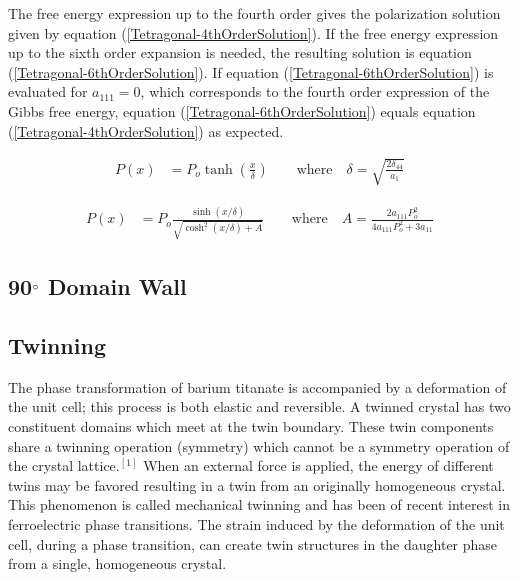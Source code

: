 \documentclass{article}
\begin{document}
The free energy expression up to the fourth order gives the polarization solution given by equation (\ref{Tetragonal-4thOrderSolution}).  If the free energy expression up to the sixth order expansion is needed, the resulting solution is equation (\ref{Tetragonal-6thOrderSolution}).  If equation (\ref{Tetragonal-6thOrderSolution}) is evaluated for $a_{111}= 0$, which corresponds to the fourth order expression of the Gibbs free energy, equation (\ref{Tetragonal-6thOrderSolution}) equals equation (\ref{Tetragonal-4thOrderSolution}) as expected.

\begin{align}
P(x) &= P_o \tanh{(\frac{x}{\delta})} \qquad \text{where} \quad \delta=\sqrt{\frac{2 \delta_{44}}{a_1}}
\label{Tetragonal-4thOrderSolution}
\end{align}

\begin{align}
P(x) &= P_o \frac{\sinh{(x/\delta)}}{\sqrt{\cosh^2{(x/\delta)} + A} } \qquad \text{where} \quad A=\frac{2 a_{111} P_o^2}{4 a_{111} P_o^2 + 3 a_{11}}
\label{Tetragonal-6thOrderSolution}
\end{align}

\subsection{90$\degree$ Domain Wall}

\subsection{Twinning}

The phase transformation of barium titanate is accompanied by a deformation of the unit cell; this process is both elastic and reversible.  A twinned crystal has two constituent domains which meet at the twin boundary.  These twin components share a twinning operation (symmetry) which cannot be a symmetry operation of the crystal lattice.$^{ [1]}$  When an external force is applied, the energy of different twins may be favored resulting in a twin from an originally homogeneous crystal.  This phenomenon is called mechanical twinning and has been of recent interest in ferroelectric phase transitions.  The strain induced by the deformation of the unit cell, during a phase transition, can create twin structures in the daughter phase from a single, homogeneous crystal.
\end{document}
